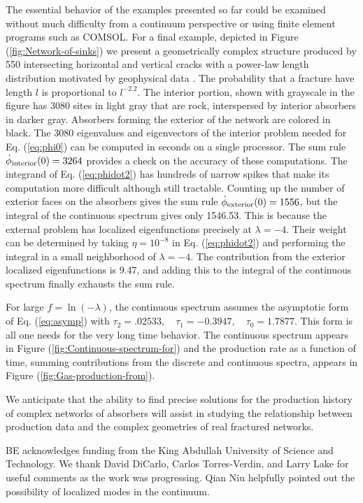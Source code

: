 \documentclass[english,notitlepage,twocolumn]{revtex4-1}
\begin{document}
The essential behavior of the examples presented so far could be examined
without much difficulty from a continuum perspective \cite{Carslaw.59}
or using finite element programs such as COMSOL. For a final example,
depicted in Figure (\ref{fig:Network-of-sinks}) we present a geometrically
complex structure produced by 550 intersecting horizontal and vertical
cracks with a power-law length distribution motivated by geophysical
data \cite{Eftekhari.16}. The probability that a fracture have length
$l$ is proportional to $l^{-2.2}$. The interior portion, shown with
grayscale in the figure has 3080 sites in light gray that are rock,
interspersed by interior absorbers in darker gray. Absorbers forming
the exterior of the network are colored in black. The 3080 eigenvalues
and eigenvectors of the interior problem needed for Eq. (\ref{eq:phi0})
can be computed in seconds on a single processor. The sum rule $\dot{\phi}_{{\rm interior}}(0)=3264$
provides a check on the accuracy of these computations. The integrand
of Eq. (\ref{eq:phidot2}) has hundreds of narrow spikes that make
its computation more difficult although still tractable. Counting
up the number of exterior faces on the absorbers gives the sum rule
$\dot{\phi}_{{\rm exterior}}(0)=1556$, but the integral of the continuous
spectrum gives only 1546.53. This is because the external problem
has localized eigenfunctions precisely at $\lambda=-4$. Their weight
can be determined by taking $\eta=10^{-8}$ in Eq. (\ref{eq:phidot2})
and performing the integral in a small neighborhood of $\lambda=-4.$
The contribution from the exterior localized eigenfunctions is 9.47,
and adding this to the integral of the continuous spectrum finally
exhausts the sum rule. 

For large $f=\ln\left(-\lambda\right)$, the continuous spectrum assumes
the asymptotic form of Eq. (\ref{eq:asymp}) with $\tau_{2}=.02533,\quad\tau_{1}=-0.3947,\quad\tau_{0}=1.7877.$
This form is all one needs for the very long time behavior. The continuous
spectrum appears in Figure (\ref{fig:Continuous-spectrum-for}) and
the production rate as a function of time, summing contributions from
the discrete and continuous spectra, appears in Figure (\ref{fig:Gas-production-from}). 

We anticipate that the ability to find precise solutions for the production
history of complex networks of absorbers will assist in studying the
relationship between production data and the complex geometries of
real fractured networks.
\begin{acknowledgments}
BE acknowledges funding from the King Abdullah University of Science
and Technology. We thank David DiCarlo, Carlos Torres-Verdin, and
Larry Lake for useful comments as the work was progressing. Qian Niu
helpfully pointed out the possibility of localized modes in the continuum.
\end{acknowledgments}



\end{document}
